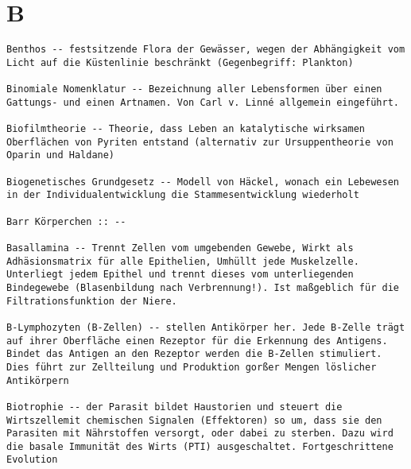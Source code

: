 \documentclass{article}
\begin{document}
\section{B}
\begin{verbatim}
Benthos -- festsitzende Flora der Gewässer, wegen der Abhängigkeit vom Licht auf die Küstenlinie beschränkt (Gegenbegriff: Plankton)

Binomiale Nomenklatur -- Bezeichnung aller Lebensformen über einen Gattungs- und einen Artnamen. Von Carl v. Linné allgemein eingeführt.

Biofilmtheorie -- Theorie, dass Leben an katalytische wirksamen Oberflächen von Pyriten entstand (alternativ zur Ursuppentheorie von Oparin und Haldane)

Biogenetisches Grundgesetz -- Modell von Häckel, wonach ein Lebewesen in der Individualentwicklung die Stammesentwicklung wiederholt

Barr Körperchen :: --

Basallamina -- Trennt Zellen vom umgebenden Gewebe, Wirkt als Adhäsionsmatrix für alle Epithelien, Umhüllt jede Muskelzelle. Unterliegt jedem Epithel und trennt dieses vom unterliegenden Bindegewebe (Blasenbildung nach Verbrennung!). Ist maßgeblich für die Filtrationsfunktion der Niere.

B-Lymphozyten (B-Zellen) -- stellen Antikörper her. Jede B-Zelle trägt auf ihrer Oberfläche einen Rezeptor für die Erkennung des Antigens. Bindet das Antigen an den Rezeptor werden die B-Zellen stimuliert. Dies führt zur Zellteilung und Produktion gorßer Mengen löslicher Antikörpern

Biotrophie -- der Parasit bildet Haustorien und steuert die Wirtszellemit chemischen Signalen (Effektoren) so um, dass sie den Parasiten mit Nährstoffen versorgt, oder dabei zu sterben. Dazu wird die basale Immunität des Wirts (PTI) ausgeschaltet. Fortgeschrittene Evolution
\end{verbatim}
\newpage
\end{document}
